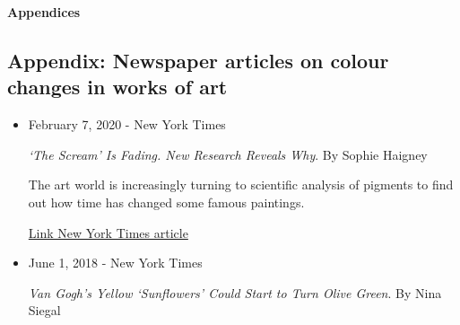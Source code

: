 
\newpage
\appendix


\pagecolor{mygray}

\begin{titlepage}
   \begin{center}
       \vspace*{6cm}
       {\fontsize{40pt}{46pt}\selectfont \textbf{Appendices}}\\          
   \end{center}
\end{titlepage}

\pagecolor{white}


\begin{appendices}





\renewcommand{\thesection}{1.\arabic{section}}




\section[\hspace{0.3cm}Newspaper articles on colour changes in works of art]{ Appendix: Newspaper articles on colour changes in works of art}
\label{app:ch1_articles_lid}

\begin{itemize}
    \item February 7, 2020 - New York Times
    
    \textit{‘The Scream’ Is Fading. New Research Reveals Why}. By Sophie Haigney
    
    The art world is increasingly turning to scientific analysis of pigments to find out how time has changed some famous paintings.

    \href{https://www.nytimes.com/2020/02/07/arts/design/the-scream-edvard-munch-science.html}{Link New York Times article}\\
       

    \item June 1, 2018 - New York Times
    
    \textit{Van Gogh’s Yellow ‘Sunflowers’ Could Start to Turn Olive Green}. By Nina Siegal
    

\end{itemize}
\end{appendices}
